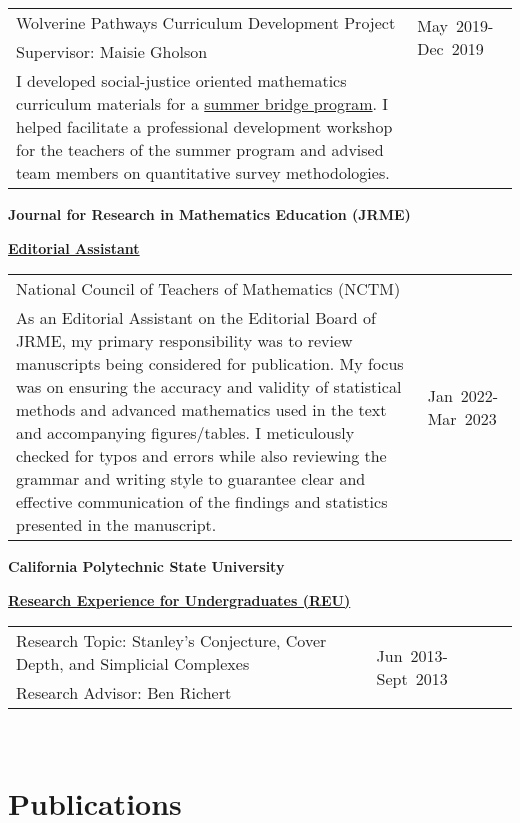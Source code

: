 \documentclass[margin,line]{res}
\renewcommand{\subsection}[1]{%
      \par\vspace{3pt}%
      \underline{\normalsize\bfseries #1}%
      \par\vspace{3pt}%
    }
\begin{document}
\begin{resume}
\begin{tabular}{@{}p{4.0in}p{1.0in}}
  Wolverine Pathways Curriculum Development Project  & \multirow{2}{1in}{May~2019-Dec~2019}\\
Supervisor: Maisie Gholson \\
I developed social-justice oriented mathematics curriculum materials for a \href{https://lsa.umich.edu/csp/bridge-programs/sbsp-courses.html}{summer bridge program}. I helped facilitate a professional development workshop for the teachers of the summer program and advised team members on  quantitative survey methodologies. 
\end{tabular}

\newpage
{\bf Journal for Research in Mathematics Education (JRME)}

\subsection{\sc Editorial Assistant}
\begin{tabular}{@{}p{4in}p{1.0in}}
 National Council of Teachers of Mathematics (NCTM)  & \multirow{2}{1.0in}{Jan~2022-Mar~2023}\\
As an Editorial Assistant on the Editorial Board of JRME, my primary responsibility was to review manuscripts being considered for publication. My focus was on ensuring the accuracy and validity of statistical methods and advanced mathematics used in the text and accompanying figures/tables. I meticulously checked for typos and errors while also reviewing the grammar and writing style to guarantee clear and effective communication of the findings and statistics presented in the manuscript.
\end{tabular}

{\bf California Polytechnic State University}
\subsection{\sc Research Experience for Undergraduates (REU)}
\begin{tabular}{@{}p{4in}p{0.4in}p{0.8in}}
  Research Topic: Stanley's Conjecture, Cover Depth, and Simplicial  Complexes & \multirow{2}{1.0in}{Jun~2013-Sept~2013}\\
  Research Advisor: Ben Richert \\
\end{tabular}\\


\section{\sc Publications}


\end{resume}
\end{document}
